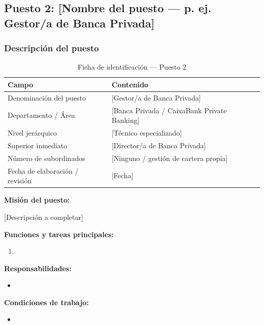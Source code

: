 \subsection{Puesto 2: [Nombre del puesto — p. ej. Gestor/a de Banca Privada]}

\subsubsection{Descripción del puesto}

\begin{table}[H]
  \centering
  \small
  \caption{Ficha de identificación — Puesto 2}
  \begin{tabularx}{\textwidth}{lX}
    \toprule
    \textbf{Campo}               & \textbf{Contenido} \\
    \midrule
    Denominación del puesto      & [Gestor/a de Banca Privada] \\
    Departamento / Área          & [Banca Privada / CaixaBank Private Banking] \\
    Nivel jerárquico             & [Técnico especializado] \\
    Superior inmediato           & [Director/a de Banca Privada] \\
    Número de subordinados       & [Ninguno / gestión de cartera propia] \\
    Fecha de elaboración / revisión & [Fecha] \\
    \bottomrule
  \end{tabularx}
\end{table}

\textbf{Misión del puesto:}

[Descripción a completar]

\textbf{Funciones y tareas principales:}
\begin{enumerate}
  \item [...]
\end{enumerate}

\textbf{Responsabilidades:}
\begin{itemize}
  \item [...]
\end{itemize}

\textbf{Condiciones de trabajo:}
\begin{itemize}
  \item [...]
\end{itemize}

